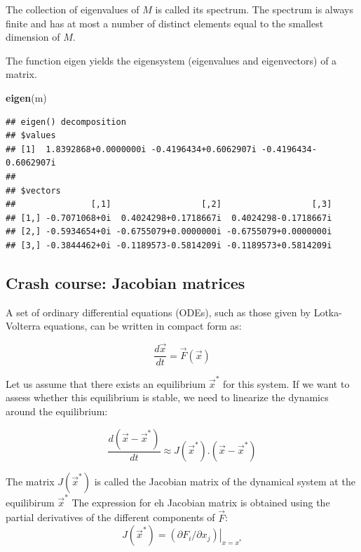 \documentclass[
]{book}
\newenvironment{Shaded}{\begin{snugshade}}{\end{snugshade}}
\newcommand{\FunctionTok}[1]{\textcolor[rgb]{0.13,0.29,0.53}{\textbf{#1}}}
\newcommand{\NormalTok}[1]{#1}
\theoremstyle{definition}
\theoremstyle{definition}
\theoremstyle{definition}
\theoremstyle{definition}
\theoremstyle{remark}
\begin{document}
The collection of eigenvalues of \(M\) is called its spectrum. The spectrum is always finite and has at most a number of distinct elements equal to the smallest dimension of \(M\).

The function eigen yields the eigensystem (eigenvalues and eigenvectors) of a matrix.

\begin{Shaded}
\begin{Highlighting}[]
\FunctionTok{eigen}\NormalTok{(m)}
\end{Highlighting}
\end{Shaded}

\begin{verbatim}
## eigen() decomposition
## $values
## [1]  1.8392868+0.0000000i -0.4196434+0.6062907i -0.4196434-0.6062907i
## 
## $vectors
##               [,1]                  [,2]                  [,3]
## [1,] -0.7071068+0i  0.4024298+0.1718667i  0.4024298-0.1718667i
## [2,] -0.5934654+0i -0.6755079+0.0000000i -0.6755079+0.0000000i
## [3,] -0.3844462+0i -0.1189573-0.5814209i -0.1189573+0.5814209i
\end{verbatim}

\subsection{Crash course: Jacobian matrices}\label{crash-course-jacobian-matrices}

A set of ordinary differential equations (ODEs), such as those given by Lotka-Volterra equations, can be written in compact form as:

\[\frac{d\overrightarrow{x}}{dt} = \overrightarrow{F}\left(\overrightarrow{x} \right)\]

Let us assume that there exists an equilibrium \(\overrightarrow{x}^*\) for this system. If we want to assess whether this equilibrium is stable, we need to linearize the dynamics around the equilibrium:

\[\frac{d\left( \overrightarrow{x}-\overrightarrow{x}^*\right)}{dt} \approx J\left(\overrightarrow{x}^*\right).\left( \overrightarrow{x}-\overrightarrow{x}^*\right)\]

The matrix \(J\left(\overrightarrow{x}^*\right)\) is called the Jacobian matrix of the dynamical system at the equilibirum \(\overrightarrow{x}^*\)
The expression for eh Jacobian matrix is obtained using the partial derivatives of the different components of \(\overrightarrow{F}\):
\[J\left(\overrightarrow{x}^*\right) = \left.\left(\partial F_i/\partial x_j\right)\right\rvert_{x=x^*}\]
\end{document}
